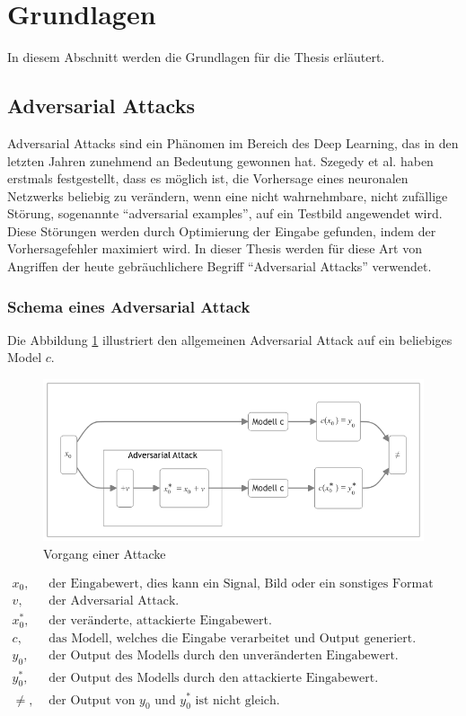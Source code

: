 \section{Grundlagen} 
In diesem Abschnitt werden die Grundlagen für die Thesis erläutert. 

\subsection{Adversarial Attacks}
Adversarial Attacks sind ein Phänomen im Bereich des Deep Learning, das in den letzten Jahren zunehmend an Bedeutung gewonnen hat. Szegedy et al. \cite{szegedy_intriguing_2014} haben erstmals festgestellt, dass es möglich ist, die Vorhersage eines neuronalen Netzwerks beliebig zu verändern, wenn eine nicht wahrnehmbare, nicht zufällige Störung, sogenannte ``adversarial examples'', auf ein Testbild angewendet wird. Diese Störungen werden durch Optimierung der Eingabe gefunden, indem der Vorhersagefehler maximiert wird. In dieser Thesis werden für diese Art von Angriffen der heute gebräuchlichere Begriff ``Adversarial Attacks'' verwendet.

\subsubsection{Schema eines Adversarial Attack} 
Die Abbildung \ref{fig:grundlagen} illustriert den allgemeinen Adversarial Attack auf ein beliebiges Model $c$. 

\begin{figure}[H]
    \centering
    \includegraphics[width=0.8\linewidth]{01-images/02-grundlagen/adversarial-attack.png}
    \caption{Vorgang einer Attacke}
    \label{fig:grundlagen}
\end{figure}

\begin{align*}
    x_0,      &\text{ der Eingabewert, dies kann ein Signal, Bild oder ein sonstiges Format sein.} \\
    v,        &\text{ der Adversarial Attack.} \\
    x_0^{*},  &\text{ der veränderte, attackierte Eingabewert.} \\
    c,        &\text{ das Modell, welches die Eingabe verarbeitet und Output generiert.} \\
    y_0,      &\text{ der Output des Modells durch den unveränderten Eingabewert.} \\
    y_0^{*},  &\text{ der Output des Modells durch den attackierte Eingabewert.} \\
    \neq,     &\text{ der Output von $y_0$ und $y_0^{*}$ ist nicht gleich.} \\
\end{align*} 

